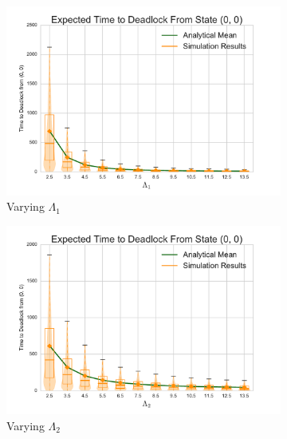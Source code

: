 \documentclass{article}
\begin{document}
\begin{center}
\begin{figure}[!htbp]
\begin{center}
\begin{subfigure}[b]{0.38\textwidth}
  \includegraphics[width=\textwidth]{images/varyL1}
  \caption{Varying $\Lambda_1$}
  \label{fig:timestodeadlock2_L1}
\end{subfigure}
\begin{subfigure}[b]{0.38\textwidth}
  \includegraphics[width=\textwidth]{images/varyL2}
  \caption{Varying $\Lambda_2$}
  \label{fig:timestodeadlock2_L2}
\end{subfigure}
\begin{subfigure}[b]{0.38\textwidth}

\end{subfigure}
\end{center}
\end{figure}
\end{center}
\end{document}
